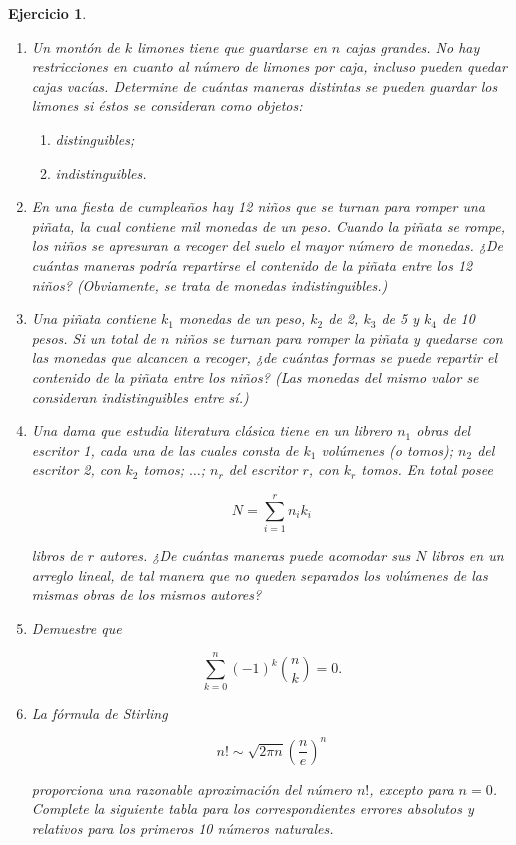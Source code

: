 \documentclass[12pt,twoside]{article}
\newtheorem{Ejer}{Ejercicio}
\begin{document}
\begin{Ejer}
\begin{enumerate}
\item Un montón de $k$ limones tiene que guardarse en $n$ cajas grandes. No hay restricciones en cuanto al número de limones por caja, incluso pueden quedar cajas vacías. Determine de cuántas maneras distintas se pueden guardar los limones si éstos se consideran como objetos:
\begin{enumerate}
\item distinguibles;
\item indistinguibles.
\end{enumerate}

\item En una fiesta de cumpleaños hay 12 niños que se turnan para romper una piñata, la cual contiene mil monedas de un peso. Cuando la piñata se rompe, los niños se apresuran a recoger del suelo el mayor número de monedas. ¿De cuántas maneras podría repartirse el contenido de la piñata entre los 12 niños? (Obviamente, se trata de monedas indistinguibles.)

\item Una piñata contiene $k_1$ monedas de un peso, $k_2$ de 2, $k_3$ de 5 y $k_4$ de 10 pesos. Si un total de $n$ niños se turnan para romper la piñata y quedarse con las monedas que alcancen a recoger, ¿de cuántas formas se puede repartir el contenido de la piñata entre los niños? (Las monedas del mismo valor se consideran indistinguibles entre sí.)

\item Una dama que estudia literatura clásica tiene en un librero $n_1$ obras del escritor 1, cada una de las cuales consta de $k_1$ volúmenes (o tomos); $n_2$ del escritor 2, con $k_2$ tomos; $\dots$; $n_r$ del escritor $r$, con $k_r$ tomos. En total posee

\[
N = \sum_{i=1}^{r} n_i k_i
\]

libros de $r$ autores. ¿De cuántas maneras puede acomodar sus $N$ libros en un arreglo lineal, de tal manera que no queden separados los volúmenes de las mismas obras de los mismos autores?

\item Demuestre que

\[
\sum_{k=0}^{n} (-1)^k \binom{n}{k} = 0.
\]

\item La fórmula de Stirling

\[
n! \sim \sqrt{2\pi n}\left(\frac{n}{e}\right)^n
\]

proporciona una razonable aproximación del número $n!$, excepto para $n=0$. Complete la siguiente tabla para los correspondientes errores absolutos y relativos para los primeros 10 números naturales.


\end{enumerate}
\end{Ejer}
\end{document}
